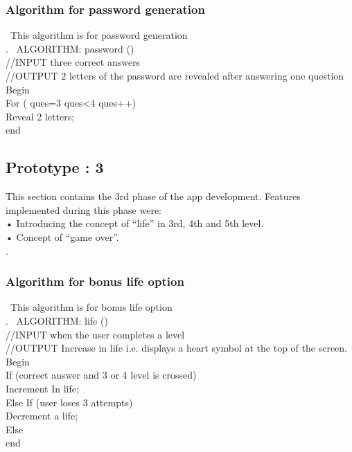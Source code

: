 \subsubsection{Algorithm for  password generation }

\ttfamily\ \hspace{1cm}This algorithm is for password generation\\
\cite{DBLP:journals/ivc/KadyrovP03}.
\rmfamily\ ALGORITHM: password () \\
//INPUT three correct answers\\
//OUTPUT 2 letters of the password are revealed after answering one question\\
Begin\\
For ( ques=3 ques<4 ques++)\\
Reveal 2 letters;\\
end
\rmfamily



\subsection{Prototype : 3}
\hspace{1cm}This section contains the 3rd phase of the app development. Features implemented during this phase were:\\
•	Introducing the concept of “life” in 3rd, 4th and 5th level.\\
•	Concept of “game over”.\\

\cite{DBLP:journals/ivc/KadyrovP03}.\\

\subsubsection{Algorithm for bonus life option}

\ttfamily\ \hspace{1cm}This algorithm is for bonus life option\\ 
\cite{DBLP:journals/ivc/KadyrovP03}.
\rmfamily\ ALGORITHM: life ()\\
//INPUT when the user completes a level\\
//OUTPUT Increase in life i.e.  displays a heart symbol at the top of the screen.\\
Begin\\
If (correct answer and 3 or 4 level is crossed)\\
Increment In life;\\
Else If (user loses 3 attempts)\\
Decrement a life;\\
Else \\
end
\rmfamily

